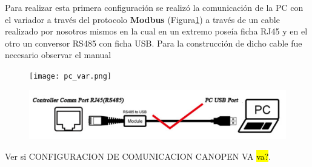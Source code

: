 Para realizar esta primera configuración se realizó la comunicación de la PC con el variador a través del protocolo \textbf{Modbus} (Figura\ref{fig:pcvar}) a través de un cable realizado por nosotros mismos en la cual en un extremo poseía ficha RJ45 y en el otro un conversor RS485 con ficha USB. Para la construcción de dicho cable fue necesario observar el manual \cite{CANopenMmanual}
\begin{figure}[H]
	\centering
	\texttt{[image: pc\_var.png]}
	\label{fig:pcvar}
\end{figure}

\begin{figure}
	\centering
	\includegraphics[width=0.7\linewidth]{images/paramsomove1}
	\caption{}
	\label{fig:paramsomove1}
\end{figure}



Ver si CONFIGURACION DE COMUNICACION CANOPEN VA \hl{va?}.

